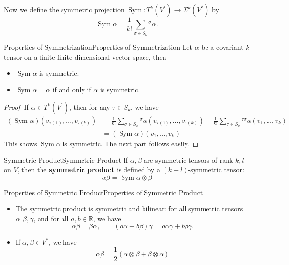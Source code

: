 \documentclass[../main.tex]{subfiles}
\begin{document}
Now we define the symmetric projection $\operatorname{Sym}: T^k(V^*) \rightarrow \Sigma^k(V^*)$ by
\begin{equation}
  \operatorname{Sym} \alpha = \frac{1}{k!} \sum_{\sigma\in S_k}^{} ^\sigma \alpha.
\end{equation}

\begin{proposition}{Properties of Symmetrization}{Properties of Symmetrization}
  Let $\alpha$ be a covariant $k$ tensor on a finite finite-dimensional vector space, then
  \begin{itemize}
    \item $\operatorname{Sym} \alpha$ is symmetric.
    \item $\operatorname{Sym} \alpha = \alpha$ if and only if $\alpha$ is symmetric.
  \end{itemize}
\end{proposition}
\begin{proof}
  If $\alpha\in T^k(V^*)$, then for any $\tau\in S_k$, we have
  \begin{equation*}
    \begin{aligned}
      (\operatorname{Sym} \alpha) (v_{\tau(1)}, \ldots ,v_{\tau(k)}) &= \frac{1}{k!} \sum_{\sigma\in S_k}^{} ^\sigma \alpha(v_{\tau(1)}, \ldots ,v_{\tau(k)}) = \frac{1}{k!} \sum_{\sigma\in S_k}^{} ^{\tau\sigma} \alpha(v_1, \ldots ,v_k) \\
      &= (\operatorname{Sym} \alpha) (v_1, \ldots ,v_k)
    \end{aligned}
  \end{equation*}
  This shows $\operatorname{Sym} \alpha$ is symmetric. The next part follows easily.
\end{proof}

\begin{definition}{Symmetric Product}{Symmetric Product}
  If $\alpha, \beta$ are symmetric tensors of rank $k,l$ on $V$, then the \textbf{symmetric product} is defined by a $(k+l)$-symmetric tensor:
  \begin{equation}
    \alpha \beta = \operatorname{Sym} \alpha \otimes \beta
  \end{equation}
\end{definition}

\begin{proposition}{Properties of Symmetric Product}{Properties of Symmetric Product}
  \begin{itemize}
    \item The symmetric product is symmetric and bilinear: for all symmetric tensors $\alpha, \beta, \gamma$, and for all $a, b\in \mathbb{R}$, we have
      \begin{equation*}
        \alpha \beta = \beta \alpha, \qquad (a \alpha + b \beta) \gamma = a \alpha \gamma + b \beta \gamma.
      \end{equation*}
    \item If $\alpha, \beta\in V^*$, we have
      \begin{equation*}
        \alpha \beta = \frac{1}{2}( \alpha\otimes \beta + \beta \otimes \alpha)
      \end{equation*}
  \end{itemize}
\end{proposition}
\end{document}
